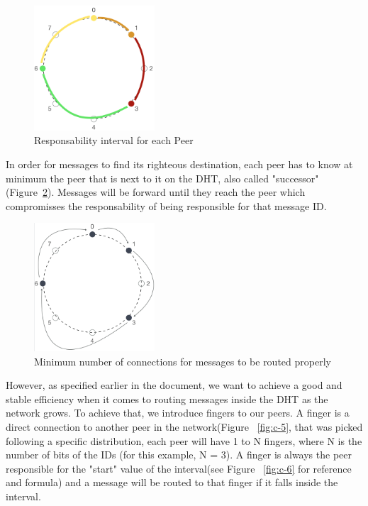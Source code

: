 \begin{figure}[h!]
  \centering
  \includegraphics[width=0.4\textwidth]{figs/chord-3}
  \caption{Responsability interval for each Peer}
  \label{fig:c-3}
\end{figure}

In order for messages to find its righteous destination, each peer has to know at minimum the peer that is next to it on the DHT, also called "successor" (Figure~\ref{fig:c-4}). Messages will be forward until they reach the peer which compromisses the responsability of being responsible for that message ID.

\begin{figure}[h!]
  \centering
  \includegraphics[width=0.4\textwidth]{figs/chord-4}
  \caption{Minimum number of connections for messages to be routed properly}
  \label{fig:c-4}
\end{figure}

However, as specified earlier in the document, we want to achieve a good and stable efficiency when it comes to routing messages inside the DHT as the network grows. To achieve that, we introduce fingers to our peers. A finger is a direct connection to another peer in the network(Figure ~\ref{fig:c-5}, that was picked following a specific distribution, each peer will have 1 to N fingers, where N is the number of bits of the IDs (for this example, N = 3). A finger is always the peer responsible for the "start" value of the interval(see Figure ~\ref{fig:c-6} for reference and formula) and a message will be routed to that finger if it falls inside the interval.

